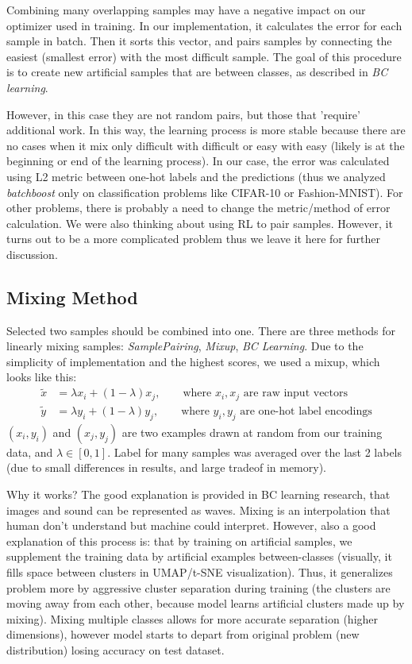 \documentclass{article}
\begin{document}
Combining many overlapping samples may have a negative impact on our optimizer
used in training.  In our implementation, it calculates the error for each
sample in batch.  Then it sorts this vector, and pairs samples by connecting the
easiest (smallest error) with the most difficult sample.  The goal of this
procedure is to create new artificial samples that are between classes, as
described in \emph{BC learning}.

However, in this case they are not random pairs, but those that 'require'
additional work. In this way, the learning process is more stable because there
are no cases when it mix only difficult with difficult or easy with easy (likely
is at the beginning or end of the learning process).
%
In our case, the error was calculated using L2 metric between one-hot labels and
the predictions (thus we analyzed \emph{batchboost} only on classification
problems like CIFAR-10\cite{krizhevsky2009learning} or
Fashion-MNIST\cite{xiao2017}). For other problems, there is probably
a need to change the metric/method of error calculation.
%
We were also thinking about using RL to pair samples. However, it turns out to
be a more complicated problem thus we leave it here for further discussion.

\subsection{Mixing Method}
\label{sec:mixing}

Selected two samples should be combined into one.
There are three methods for linearly mixing samples: \emph{SamplePairing},
\emph{Mixup}, \emph{BC Learning}. Due to the simplicity of implementation and
the highest scores, we used a mixup, which looks like this:
%
\begin{align*}
  \tilde{x} &= \lambda x_i + (1 - \lambda) x_j,\qquad \text{where~} x_i, x_j \text{~are~raw~input~vectors}\\
  \tilde{y} &= \lambda y_i + (1 - \lambda) y_j,\qquad \text{where~} y_i, y_j \text{~are~one-hot~label~encodings}
\end{align*}
$(x_i, y_i)$ and $(x_j, y_j)$ are two examples drawn at random from our
training data, and $\lambda \in [0,1]$.
Label for many samples was averaged over the last 2 labels (due to small differences in results, and large tradeof in memory).

Why it works?
The good explanation is provided in BC learning research, that images and sound
can be represented as waves. Mixing is an interpolation that human don't
understand but machine could interpret.
However, also a good explanation of this process is: that by training on
artificial samples, we supplement the training data by artificial examples between-classes
(visually, it fills space between clusters in UMAP/t-SNE visualization).
Thus, it generalizes problem more by aggressive cluster separation during
training (the clusters are moving away from each other, because model learns
artificial clusters made up by mixing).
Mixing multiple classes allows for more accurate separation (higher dimensions), however model starts to depart from original problem (new distribution) losing accuracy on test dataset.
\end{document}
